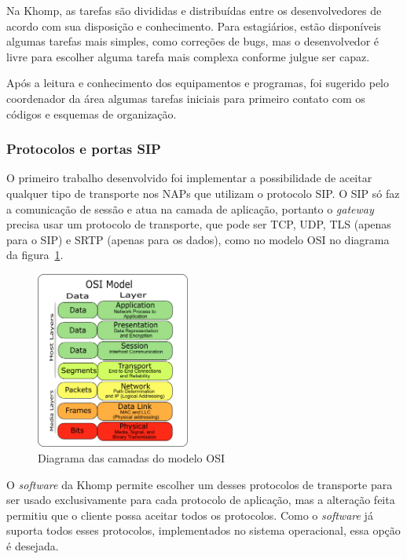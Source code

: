 \documentclass[12pt]{article}
\begin{document}
Na Khomp, as tarefas são divididas e distribuídas entre os desenvolvedores de
acordo com sua disposição e conhecimento. Para estagiários, estão disponíveis
algumas tarefas mais simples, como correções de bugs, mas o desenvolvedor é
livre para escolher alguma tarefa mais complexa conforme julgue ser capaz.

Após a leitura e conhecimento dos equipamentos e programas, foi sugerido pelo
coordenador da área algumas tarefas iniciais para primeiro contato com os
códigos e esquemas de organização.

\subsubsection{Protocolos e portas SIP}

O primeiro trabalho desenvolvido foi implementar a possibilidade de aceitar
qualquer tipo de transporte nos NAPs que utilizam o protocolo SIP. O SIP só faz
a comunicação de sessão e atua na camada de aplicação, portanto o
\textit{gateway} precisa usar um protocolo de transporte, que pode ser TCP,
UDP, TLS (apenas para o SIP) e SRTP (apenas para os dados), como no modelo OSI
no diagrama da figura~\ref{fig:osi}.

\vspace*{1em}
\begin{figure}[ht]
    \centering
    \includegraphics[width=0.45\textwidth]{osi.png}
    \caption{Diagrama das camadas do modelo OSI}
    \label{fig:osi}
\end{figure}
\vspace*{1em}

O \textit{software} da Khomp permite escolher um desses protocolos de
transporte para ser usado exclusivamente para cada protocolo de aplicação, mas
a alteração feita permitiu que o cliente possa aceitar todos os protocolos.
Como o \textit{software} já suporta todos esses protocolos, implementados no
sistema operacional, essa opção é desejada.
\end{document}
